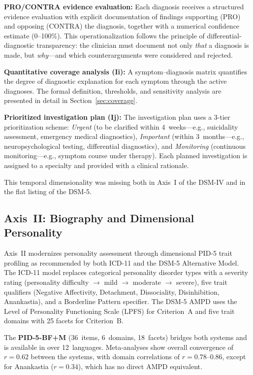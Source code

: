 \documentclass[11pt,a4paper]{article}
\begin{document}
\textbf{PRO/CONTRA evidence evaluation:} Each diagnosis receives a structured evidence evaluation with explicit documentation of findings supporting (PRO) and opposing (CONTRA) the diagnosis, together with a numerical confidence estimate (0--100\%). This operationalization follows the principle of differential-diagnostic transparency: the clinician must document not only \textit{that} a diagnosis is made, but \textit{why}---and which counterarguments were considered and rejected.

\textbf{Quantitative coverage analysis (Ii):} A symptom--diagnosis matrix quantifies the degree of diagnostic explanation for each symptom through the active diagnoses. The formal definition, thresholds, and sensitivity analysis are presented in detail in Section~\ref{sec:coverage}.

\textbf{Prioritized investigation plan (Ij):} The investigation plan uses a 3-tier prioritization scheme: \textit{Urgent} (to be clarified within 4~weeks---e.g., suicidality assessment, emergency medical diagnostics), \textit{Important} (within 3~months---e.g., neuropsychological testing, differential diagnostics), and \textit{Monitoring} (continuous monitoring---e.g., symptom course under therapy). Each planned investigation is assigned to a specialty and provided with a clinical rationale.

This temporal dimensionality was missing both in Axis~I of the DSM-IV and in the flat listing of the DSM-5.

\subsection{Axis~II: Biography and Dimensional Personality}

Axis~II modernizes personality assessment through dimensional PID-5 trait profiling as recommended by both ICD-11 and the DSM-5 Alternative Model. The ICD-11 model replaces categorical personality disorder types with a severity rating (personality difficulty $\to$ mild $\to$ moderate $\to$ severe), five trait qualifiers (Negative Affectivity, Detachment, Dissociality, Disinhibition, Anankastia), and a Borderline Pattern specifier. The DSM-5 AMPD uses the Level of Personality Functioning Scale (LPFS) for Criterion~A and five trait domains with 25 facets for Criterion~B.

The \textbf{PID-5-BF+M} (36~items, 6~domains, 18~facets) bridges both systems and is available in over 12~languages. Meta-analyses show overall convergence of $r = 0.62$ between the systems, with domain correlations of $r = 0.78$--$0.86$, except for Anankastia ($r = 0.34$), which has no direct AMPD equivalent.
\end{document}

